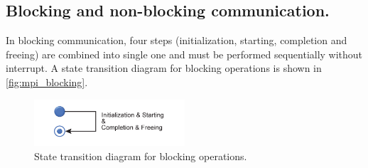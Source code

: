 \subsection{Blocking and non-blocking communication.}
In blocking communication, four steps (initialization, starting, completion and freeing) are combined into single one and must be performed sequentially without interrupt. 
A state transition diagram for blocking operations is shown in \autoref{fig:mpi_blocking}.
\begin{figure}[h!]
    \centering
    \includegraphics[width=0.5\textwidth]{pictures/mpi_blocking.png}
    \caption{State transition diagram for blocking operations. \cite{noauthor_mpi_nodate}}
    \label{fig:mpi_blocking}    
\end{figure}

